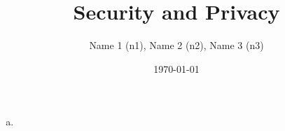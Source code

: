 \documentclass[english]{submission}
\title{Security and Privacy}
\date{\today}
\author{Name 1 (n1), Name 2 (n2), Name 3 (n3)}
\begin{document}
\maketitle

\section{}

\section{}
\begin{enumerate}[(a)]
	\item 
\end{enumerate}
\end{document}
